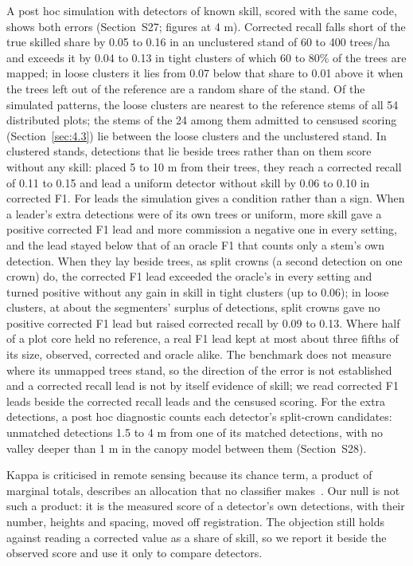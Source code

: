 \documentclass[journal]{IEEEtran}
\begin{document}
A post hoc simulation with detectors of known skill, scored with the same code,
shows both errors (Section~S27; figures at 4 m). Corrected recall falls short of
the true skilled share by 0.05 to 0.16 in an unclustered stand of 60 to 400
trees/ha and exceeds it by 0.04 to 0.13 in tight clusters of which 60 to 80\% of
the trees are mapped; in loose clusters it lies from 0.07 below that share to
0.01 above it when the trees left out of the reference are a random share of the
stand. Of the simulated patterns, the loose clusters are nearest to the
reference stems of all 54 distributed plots; the stems of the 24 among them
admitted to censused scoring (Section~\ref{sec:4.3}) lie between the loose clusters and
the unclustered stand. In clustered stands, detections that lie beside trees
rather than on them score without any skill: placed 5 to 10 m from their trees,
they reach a corrected recall of 0.11 to 0.15 and
lead a uniform detector without skill by 0.06 to 0.10 in corrected F1. For
leads the simulation gives a condition rather than a sign. When a leader's
extra detections were of its own trees or uniform, more skill gave a positive
corrected F1 lead and more commission a negative one in every setting, and the
lead stayed below that of an oracle F1 that counts only a stem's own
detection. When they lay beside trees, as split crowns (a second detection on
one crown) do, the corrected F1 lead exceeded the oracle's in every setting
and turned positive without any gain in skill in tight clusters (up to 0.06);
in loose clusters, at about the segmenters' surplus of detections, split
crowns gave no positive corrected F1 lead but raised corrected recall by 0.09
to 0.13. Where half of a plot core held no reference, a real F1 lead kept at
most about three fifths of its size, observed, corrected and oracle alike. The
benchmark does not measure where its unmapped trees stand, so the direction of
the error is not established and a corrected recall lead is not by itself
evidence of skill; we read corrected F1 leads beside the corrected recall leads
and the censused scoring. For the extra detections, a post hoc diagnostic counts
each detector's split-crown candidates: unmatched detections 1.5 to 4 m from one
of its matched detections, with no valley deeper than 1 m in the canopy model
between them (Section~S28).

Kappa is criticised in remote sensing because its chance term, a product of
marginal totals, describes an allocation that no classifier makes~\cite{pontius2011death,foody2020explaining}. Our null is not such a product: it is
the measured score of a detector's own detections, with their number, heights
and spacing, moved off registration. The objection still holds against reading a
corrected value as a share of skill, so we report it beside the observed score
and use it only to compare detectors.
\end{document}
